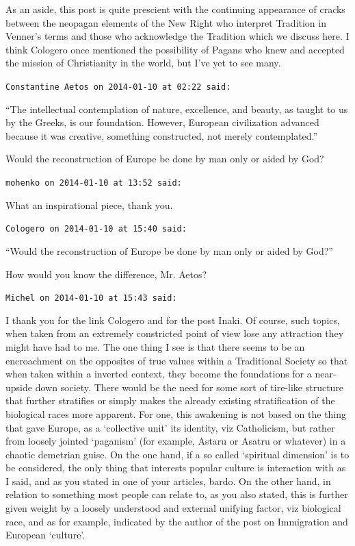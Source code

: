 \begin{footnotesize}
\begin{sffamily}
As an aside, this post is quite prescient with the continuing appearance of cracks between the neopagan elements of the New Right who interpret Tradition in Venner's terms and those who acknowledge the Tradition which we discuss here. I think Cologero once mentioned the possibility of Pagans who knew and accepted the mission of Christianity in the world, but I've yet to see many.

\hfill

\texttt{Constantine Aetos on 2014-01-10 at 02:22 said:}

``The intellectual contemplation of nature, excellence, and beauty, as taught to us by the Greeks, is our foundation. However, European civilization advanced because it was creative, something constructed, not merely contemplated.''

Would the reconstruction of Europe be done by man only or aided by God?

\hfill

\texttt{mohenko on 2014-01-10 at 13:52 said:}

What an inspirational piece, thank you.

\hfill

\texttt{Cologero on 2014-01-10 at 15:40 said:}

``Would the reconstruction of Europe be done by man only or aided by God?''

How would you know the difference, Mr. Aetos?

\hfill

\texttt{Michel on 2014-01-10 at 15:43 said:}

I thank you for the link Cologero and for the post Inaki. Of course, such topics, when taken from an extremely constricted point of view lose any attraction they might have had to me. The one thing I see is that there seems to be an encroachment on the opposites of true values within a Traditional Society so that when taken within a inverted context, they become the foundations for a near-upside down society. There would be the need for some sort of tire-like structure that further stratifies or simply makes the already existing stratification of the biological races more apparent. For one, this awakening is not based on the thing that gave Europe, as a `collective unit' its identity, viz Catholicism, but rather from loosely jointed `paganism' (for example, Astaru or Asatru or whatever) in a chaotic demetrian guise. On the one hand, if a so called `spiritual dimension' is to be considered, the only thing that interests popular culture is interaction with as I said, and as you stated in one of your articles, bardo. On the other hand, in relation to something most people can relate to, as you also stated, this is further given weight by a loosely understood and external unifying factor, viz biological race, and as for example, indicated by the author of the post on Immigration and European `culture'.


\end{sffamily}
\end{footnotesize}
